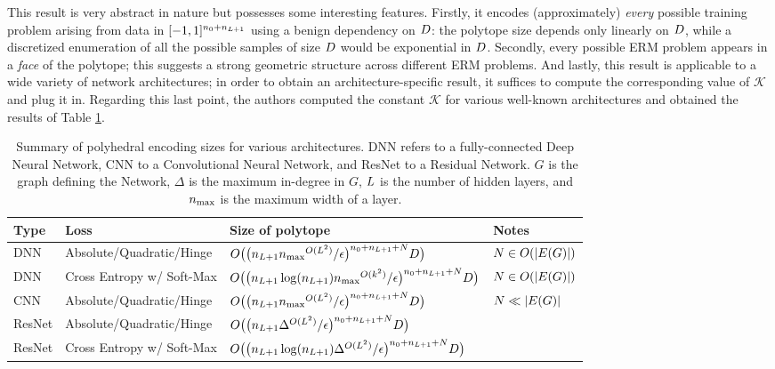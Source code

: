 This result is very abstract in nature but possesses some interesting features. Firstly, it encodes (approximately) \emph{every} possible training problem arising from data in $[-1,1]^{{n_0}+{n_{L+1}}}$ using a benign dependency on $D$: the polytope size depends only linearly on $D$, while a discretized enumeration of all the possible samples of size $D$ would be exponential in $D$. Secondly, every possible ERM problem appears in a \emph{face} of the polytope; this suggests a strong geometric structure across different ERM problems. And lastly, this result is applicable to a wide variety of network architectures; in order to obtain an architecture-specific result, it suffices to compute the corresponding value of $\mathcal{K}$ and plug it in. Regarding this last point, the authors computed the constant $\mathcal{K}$ for various well-known architectures and obtained the results of Table \ref{tab:results}.

\begin{table}
  \caption{Summary of polyhedral encoding sizes for various architectures. DNN refers to a fully-connected Deep Neural Network, CNN to a Convolutional Neural Network, and ResNet to a Residual Network. $G$ is the graph defining the Network, $\Delta$ is the maximum in-degree in $G$, $L$ is the number of hidden layers, and ${n_{\max}}$ is the maximum width of a layer.}
  \label{tab:results}
\vskip 0.15in
\begin{adjustbox}{max width=\textwidth}
  \begin{tabular}[h]{llll}
\hline
    Type  & Loss & Size of polytope & Notes  \\
\hline \hline
DNN & Absolute/Quadratic/Hinge & $O\big(\big( {n_{L+1}} {n_{\max}}^{O(L^2)} /\epsilon \big)^{{n_0}+{n_{L+1}}+N} D \big)$ & $N\in O(|E({G})|)$ \\
DNN & Cross Entropy w/ Soft-Max & $O\big(\big( {n_{L+1}} \log ({n_{L+1}}) {n_{\max}}^{O(k^2)} /\epsilon\big)^{{n_0}+{n_{L+1}}+N} D\big)$ & $N\in O(|E({G})|)$ \\
CNN & Absolute/Quadratic/Hinge & $O\big(\big( {n_{L+1}} {n_{\max}}^{O(L^2)} /\epsilon\big)^{{n_0}+{n_{L+1}}+N} D\big)$ & $N \ll |E({G})|$ \\
ResNet & Absolute/Quadratic/Hinge & $O\big(\big( {n_{L+1}} \Delta^{O(L^2)} /\epsilon\big)^{{n_0}+{n_{L+1}}+N} D\big)$  \\
ResNet & Cross Entropy w/ Soft-Max & $O\big(\big( {n_{L+1}} \log({n_{L+1}}) \Delta^{O(L^2)} /\epsilon\big)^{{n_0}+{n_{L+1}}+N} D\big)$  \\
\hline
  \end{tabular}
  \end{adjustbox}
\vskip -0.1in
\end{table}

